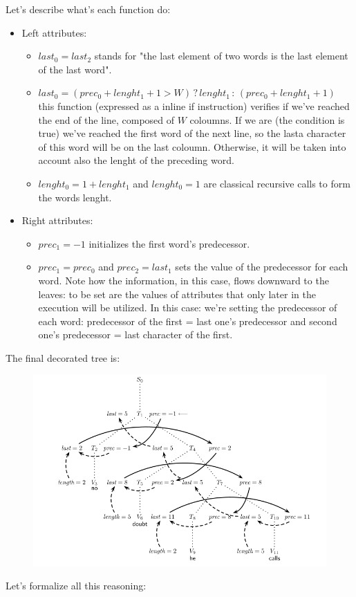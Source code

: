 \documentclass[10pt,a4paper]{article}
\begin{document}
					Let's describe what's each function do:
					\begin{itemize}
						\item Left attributes:
						\begin{itemize}
							\item $last_0 = last_2$ stands for "the last element of two words is the last element of the last word".
							\item $last_0 = (prec_0 + lenght_1 + 1 > W) \,?\, lenght_1 \,:\, (prec_0 + lenght_1 + 1)$ this function (expressed as a inline if instruction) verifies if we've reached the end of the line, composed of $W$ coloumns. If we are (the condition is true) we've reached the first word of the next line, so the lasta character of this word will be on the last coloumn. Otherwise, it will be taken into account also the lenght of the preceding word.
							\item  $lenght_0 = 1 + lenght_1$ and $lenght_0 = 1$ are classical recursive calls to form the words lenght.
						\end{itemize}
						\item Right attributes:
							\begin{itemize}
								\item $prec_1 = -1$ initializes the first word's predecessor.
								\item $prec_1 = prec_0$ and $prec_2 = last_1$ sets the value of the predecessor for each word. Note how the information, in this case, flows downward to the leaves: to be set are the values of attributes that only later in the execution will be utilized. In this case: we're setting the predecessor of each word: predecessor of the first = last one's predecessor and second one's predecessor = last character of the first.
							\end{itemize}
					\end{itemize}
					The final decorated tree is:
					\begin{figure}[H]
						\includegraphics[width = \textwidth]{./images/decTree.png}
					\end{figure}
					Let's formalize all this reasoning:
				
\end{document}
